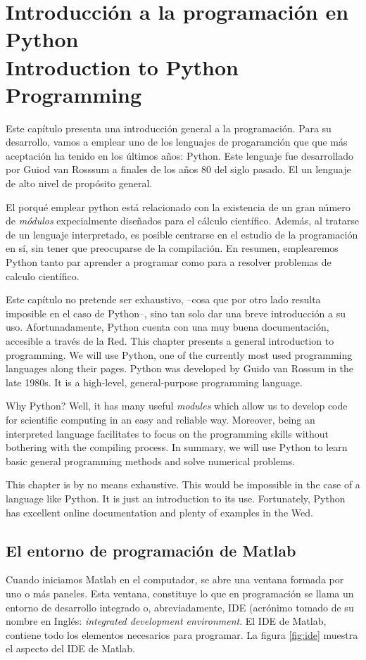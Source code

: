 \chapter{Introducción a la programación en Python\\ Introduction to Python Programming} 
\begin{paracol}{2}
Este capítulo presenta una introducción general a la programación. Para su desarrollo, vamos a emplear uno de los lenguajes de progaramción que  que más aceptación ha tenido en los últimos años: Python. Este lenguaje fue desarrollado por Guiod van Rosssum a finales de los años 80 del siglo pasado. El un lenguaje de alto nivel de propósito general.

El porqué emplear python está relacionado con la existencia de un gran número de \emph{módulos} expecialmente diseñados para el cálculo científico. Además, al tratarse de un lenguaje interpretado, es posible centrarse en el estudio de la programación en sí, sin tener que preocuparse de la compilación. En resumen, emplearemos Python tanto par aprender a programar como para a resolver problemas de calculo científico.

Este capítulo no pretende ser exhaustivo, --cosa que por otro lado resulta imposible en el caso de Python--, sino tan solo dar una breve introducción a su uso. Afortunadamente, Python cuenta con una muy buena documentación, accesible a través de la Red. 
\switchcolumn
This chapter presents a general introduction to programming. We will use Python, one of the currently most used programming languages along their pages. Python was developed by Guido van Rossum in the late 1980s. It is a high-level, general-purpose programming language. 

Why Python? Well, it has many useful \emph{modules} which allow us to develop code for scientific computing in an easy and reliable way. Moreover, being an interpreted language facilitates to focus on the programming skills without bothering with the compiling process. In summary, we will use Python to learn basic general programming methods and solve numerical problems.

This chapter is by no means exhaustive. This would be impossible in the case of a language like Python. It is just an introduction to its use. Fortunately, Python has excellent online documentation and plenty of examples in the Wed. 
\end{paracol}



\section{El entorno de programación de Matlab}
Cuando iniciamos Matlab en el computador, se abre una ventana formada por uno o más paneles. Esta ventana, constituye lo que en programación se  llama un entorno de desarrollo integrado o, abreviadamente, IDE (acrónimo tomado de su nombre en Inglés: \emph{integrated development environment}. El IDE de Matlab, contiene todo los elementos necesarios para programar. La figura \ref{fig:ide} muestra el aspecto del IDE de Matlab.

